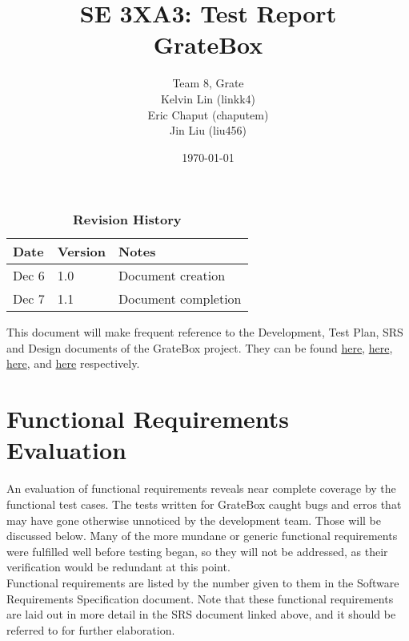 \documentclass[12pt, titlepage]{article}
\title{SE 3XA3: Test Report\\GrateBox}
\author{Team 8, Grate
		\\ Kelvin Lin (linkk4)
		\\ Eric Chaput (chaputem)
		\\ Jin Liu (liu456)
}
\date{\today}
\begin{document}
\maketitle

\tableofcontents
\listoftables
\listoffigures

\begin{table}[bp]
\caption{\bf Revision History}
\begin{tabularx}{\textwidth}{p{3cm}p{2cm}X}
\toprule {\bf Date} & {\bf Version} & {\bf Notes}\\
\midrule
Dec 6 & 1.0 & Document creation\\
Dec 7 & 1.1 & Document completion\\
\bottomrule
\end{tabularx}
\end{table}

\newpage


This document will make frequent reference to the Development, Test Plan, SRS 
and Design documents of the GrateBox project. They can be found 
\href{https://gitlab.cas.mcmaster.ca/linkk4/GrateBox/tree/master/Doc/DevelopmentPlan}{here}, 
\href{https://gitlab.cas.mcmaster.ca/linkk4/GrateBox/tree/master/Doc/TestPlan}{here}, 
\href{https://gitlab.cas.mcmaster.ca/linkk4/GrateBox/tree/master/Doc/SRS}{here}, 
and 
\href{https://gitlab.cas.mcmaster.ca/linkk4/GrateBox/tree/master/Doc/Design}{here} 
respectively.

\section{Functional Requirements Evaluation}

An evaluation of functional requirements reveals near complete coverage by the functional test cases. The tests written for GrateBox caught bugs and erros that may have gone otherwise unnoticed by the development team. Those will be discussed below. Many of the more mundane or generic functional requirements were fulfilled well before testing began, so they will not be addressed, as their verification would be redundant at this point. \\

Functional requirements are listed by the number given to them in the Software Requirements Specification document. Note that these functional requirements are laid out in more detail in the SRS document linked above, and it should be referred to for further elaboration.\\
\end{document}
